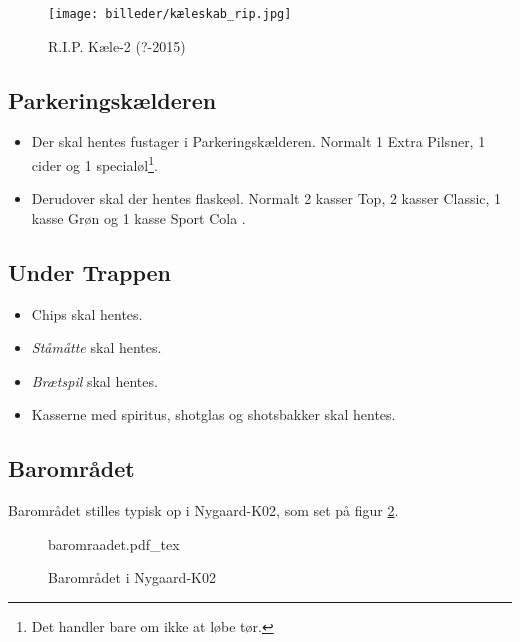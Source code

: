 \begin{figure}[H]
	\centering
	\texttt{[image: billeder/kæleskab\_rip.jpg]}
	\caption{R.I.P. Kæle-2 (?-2015)}
	\label{fig:køleskab-rip}
\end{figure}

\subsection{Parkeringskælderen}
\label{sec:pre:hopper}

\begin{itemize}
	\item Der skal hentes fustager i Parkeringskælderen. Normalt 1
	Extra Pilsner, 1 cider og 1 specialøl\footnote[1]{\label{note1}Det handler bare om ikke at løbe
	tør.}.
	\item Derudover skal der hentes flaskeøl. Normalt 2 kasser Top, 2 kasser Classic,
	1 kasse Grøn og 1 kasse Sport Cola \footnotemark[1].
\end{itemize}

\subsection{Under Trappen}
\label{sec:pre:under-trappen}

\begin{itemize}
	\item Chips skal hentes.
	\item \textit{Ståmåtte} skal hentes.
	\item \textit{Brætspil} skal hentes.
	\item Kasserne med spiritus, shotglas og shotsbakker skal hentes.
\end{itemize}

\subsection{Barområdet}
\label{sec:pre:baromradet}

Barområdet stilles typisk op i Nygaard-K02, som set på figur \ref{fig:baromraadet}.

\begin{figure}[H]
	\centering
	\def\svgwidth{\columnwidth}
	{\small{baromraadet.pdf_tex}}
	\caption{Barområdet i Nygaard-K02}
	\label{fig:baromraadet}
\end{figure}

